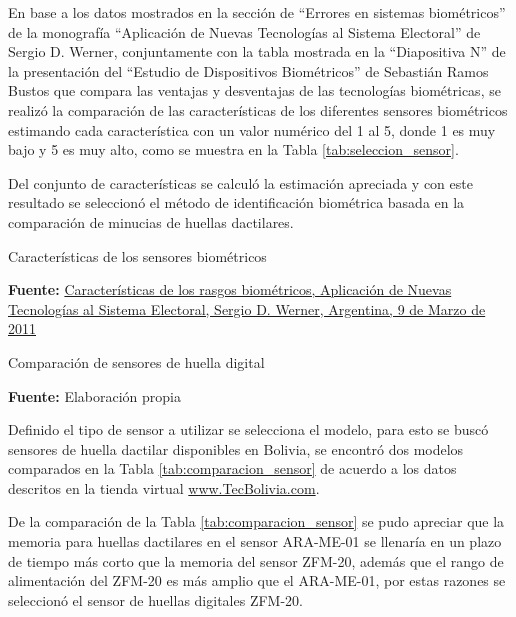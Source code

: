 \documentclass[../principal]{subfiles}
\begin{document}
  En base a los datos mostrados en la sección de ``Errores en sistemas biométricos'' de la monografía ``Aplicación de Nuevas Tecnologías al Sistema Electoral'' de Sergio D. Werner\cite{web:aplicacion_sistema_electoral_biometrico}, conjuntamente con la tabla mostrada en la ``Diapositiva N'' de la presentación del ``Estudio de Dispositivos Biométricos'' de Sebastián Ramos Bustos\cite{web:soluciones_umanick} que compara las ventajas y desventajas de las tecnologías biométricas, se realizó la comparación de las características de los diferentes sensores biométricos estimando cada característica con un valor numérico del 1 al 5, donde 1 es muy bajo y 5 es muy alto, como se muestra en la Tabla \ref{tab:seleccion_sensor}.

  Del conjunto de características se calculó la estimación apreciada y con este resultado se seleccionó el método de identificación biométrica basada en la comparación de minucias de huellas dactilares.

  \begin{table}[H]
    \centering
    \caption{Características de los sensores biométricos}
    
    \caption*{\textbf{Fuente:} \href{http://www.monografias.com/trabajos82/biometria-y-voto-electronico/biometria-y-voto-electronico2.shtml}{Características de los rasgos biométricos, Aplicación de Nuevas Tecnologías al Sistema Electoral, Sergio D. Werner, Argentina, 9 de Marzo de 2011}}
    \label{tab:seleccion_sensor}
  \end{table}

  \begin{table}[H]
    \centering
    \caption{Comparación de sensores de huella digital}
    
    \caption*{\textbf{Fuente:} Elaboración propia}
    \label{tab:comparacion_sensor}
  \end{table}

  Definido el tipo de sensor a utilizar se selecciona el modelo, para esto se buscó sensores de huella dactilar disponibles en Bolivia, se encontró dos modelos comparados en la Tabla \ref{tab:comparacion_sensor} de acuerdo a los datos descritos en la tienda virtual \href{www.TecBolivia.com}{www.TecBolivia.com}.

  De la comparación de la Tabla \ref{tab:comparacion_sensor} se pudo apreciar que la memoria para huellas dactilares en el sensor ARA-ME-01 se llenaría en un plazo de tiempo más corto que la memoria del sensor ZFM-20, además que el rango de alimentación del ZFM-20 es más amplio que el ARA-ME-01, por estas razones se seleccionó el sensor de huellas digitales ZFM-20.
\end{document}
